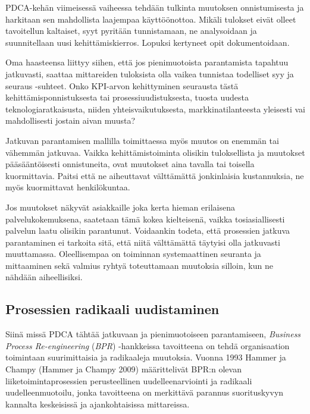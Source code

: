 \documentclass[
  finnish,
  letterpaper,
  DIV=11,
  numbers=noendperiod,
  oneside]{scrreprt}
\begin{document}
PDCA-kehän viimeisessä vaiheessa tehdään tulkinta muutoksen
onnistumisesta ja harkitaan sen mahdollista laajempaa käyttöönottoa.
Mikäli tulokset eivät olleet tavoitellun kaltaiset, syyt pyritään
tunnistamaan, ne analysoidaan ja suunnitellaan uusi kehittämiskierros.
Lopuksi kertyneet opit dokumentoidaan.

Oma haasteensa liittyy siihen, että jos pienimuotoista parantamista
tapahtuu jatkuvasti, saattaa mittareiden tuloksista olla vaikea
tunnistaa todelliset syy ja seuraus -suhteet. Onko KPI-arvon
kehittyminen seurausta tästä kehittämisponnistuksesta tai
prosessiuudistuksesta, tuosta uudesta teknologiaratkaisusta, niiden
yhteisvaikutuksesta, markkinatilanteesta yleisesti vai mahdollisesti
jostain aivan muusta?

Jatkuvan parantamisen mallilla toimittaessa myös muutos on enemmän tai
vähemmän jatkuvaa. Vaikka kehittämistoiminta olisikin tuloksellista ja
muutokset pääsääntöisesti onnistuneita, ovat muutokset aina tavalla tai
toisella kuormittavia. Paitsi että ne aiheuttavat välttämättä
jonkinlaisia kustannuksia, ne myös kuormittavat henkilökuntaa.

Jos muutokset näkyvät asiakkaille joka kerta hieman erilaisena
palvelukokemuksena, saatetaan tämä kokea kielteisenä, vaikka
tosiasiallisesti palvelun laatu olisikin parantunut. Voidaankin todeta,
että prosessien jatkuva parantaminen ei tarkoita sitä, että niitä
välttämättä täytyisi olla jatkuvasti muuttamassa. Oleellisempaa on
toiminnan systemaattinen seuranta ja mittaaminen sekä valmius ryhtyä
toteuttamaan muutoksia silloin, kun ne nähdään aiheellisiksi.

\subsection{Prosessien radikaali
uudistaminen}\label{prosessien-radikaali-uudistaminen}

Siinä missä PDCA tähtää jatkuvaan ja pienimuotoiseen parantamiseen,
\emph{Business Process Re-engineering} (\emph{BPR}) -hankkeissa
tavoitteena on tehdä organisaation toimintaan suurimittaisia ja
radikaaleja muutoksia. Vuonna 1993 Hammer ja Champy (Hammer ja Champy
2009) määrittelivät BPR:n olevan liiketoimintaprosessien perusteellinen
uudelleenarviointi ja radikaali uudelleenmuotoilu, jonka tavoitteena on
merkittävä parannus suorituskyvyn kannalta keskeisissä ja
ajankohtaisissa mittareissa.
\end{document}
